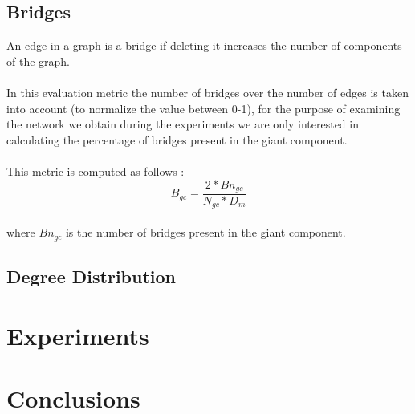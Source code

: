 \documentclass{llncs}
\begin{document}
\subsection{Bridges}
An edge in a graph is a bridge if deleting it increases the number of components of the graph.\\\\
%
In this evaluation metric the number of bridges over the number of edges is taken into account (to normalize the value between 0-1), for the purpose of examining the network we obtain during the experiments we are only interested in calculating the percentage of bridges present in the giant component.\\\\
%
This metric is computed as follows : \\
%
\[ B_{gc} = \frac{2 * Bn_{gc}}{N_{gc} * D_{m} } \]
%
\\
where $Bn_{gc}$ is the number of bridges present in the giant component.
\subsection{Degree Distribution}
%
\section{Experiments}
%
\section{Conclusions}
%
\begin{thebibliography}{}
	
\end{thebibliography}
\end{document}
